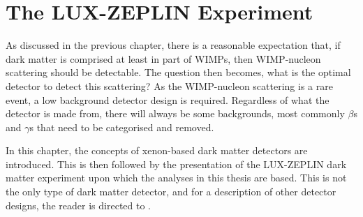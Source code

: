 \chapter{The LUX-ZEPLIN Experiment}
\label{sec:lz_detector_chapter}
\par
As discussed in the previous chapter, there is a reasonable expectation that, if dark matter is comprised at least in part of WIMPs, then WIMP-nucleon scattering should be detectable.
The question then becomes, what is the optimal detector to detect this scattering?
As the WIMP-nucleon scattering is a rare event, a low background detector design is required.
Regardless of what the detector is made from, there will always be some backgrounds, most commonly $\beta$s and $\gamma$s that need to be categorised and removed.
\par
In this chapter, the concepts of xenon-based dark matter detectors are introduced.
This is then followed by the presentation of the LUX-ZEPLIN dark matter experiment upon which the analyses in this thesis are based.
This is not the only type of dark matter detector, and for a description of other detector designs, the reader is directed to \cite{direct_detector_designs_ref}.





%